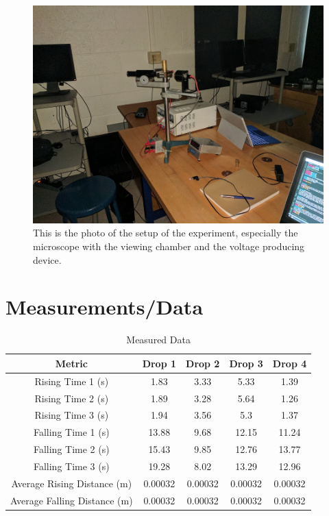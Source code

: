 \documentclass[11pt]{article}
\begin{document}
\begin{figure}[h]
\begin{center}
\includegraphics[scale=0.4]{lab1.jpg}
\caption{This is the photo of the setup of the experiment, especially the microscope with the viewing chamber and the voltage producing device.}
\label{equip}
\end{center}
\end{figure}

\section{Measurements/Data} \label{Measurements}

\begin{table}[htp]
\begin{center}
\begin{tabular}{|c|c|c|c|c|}
\hline
Metric & Drop 1 & Drop 2 & Drop 3 & Drop 4 \\ \hline
Rising Time 1 (s) & 1.83 & 3.33 & 5.33 & 1.39 \\
Rising Time 2 (s) & 1.89 & 3.28 & 5.64 & 1.26 \\
Rising Time 3 (s) & 1.94 & 3.56 & 5.3 & 1.37 \\
Falling Time 1 (s) & 13.88 & 9.68 & 12.15 & 11.24 \\
Falling Time 2 (s) & 15.43 & 9.85 & 12.76 & 13.77 \\
Falling Time 3 (s) & 19.28 & 8.02 & 13.29 & 12.96 \\ 
Average Rising Distance (m) & 0.00032 & 0.00032 & 0.00032 & 0.00032 \\
Average Falling Distance (m) & 0.00032 & 0.00032 & 0.00032 & 0.00032 \\
\hline
\end{tabular}
\caption{Measured Data}
\end{center}
\label{table}
\end{table}
\end{document}
